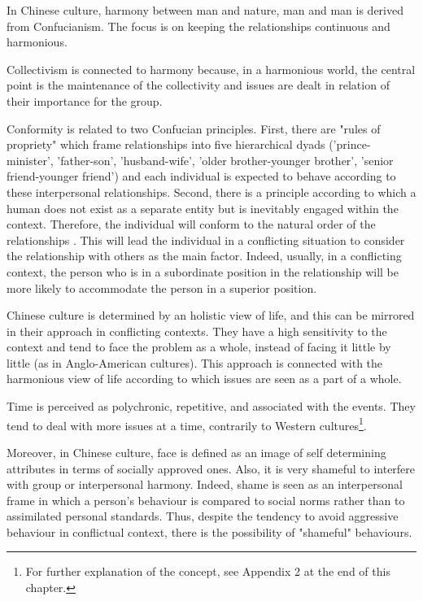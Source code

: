 \documentclass[../main.tex]{subfiles}
\begin{document}
In Chinese culture, harmony between man and nature, man and man is derived from Confucianism. The focus is on keeping the relationships continuous and harmonious. 

Collectivism is connected to harmony because, in a harmonious world, the central point is the maintenance of the collectivity and issues are dealt in relation of their importance for the group.

Conformity is related to two Confucian principles. First, there are "rules of propriety" which frame relationships into five hierarchical dyads ('prince-minister', 'father-son', 'husband-wife', 'older brother-younger brother', 'senior friend-younger friend') and each individual is expected to behave according to these interpersonal relationships. Second, there is a principle according to which a human does not exist as a separate entity but is inevitably engaged within the context. Therefore, the individual will conform to the natural order of the relationships \autocite[367-368]{tang}. This will lead the individual in a conflicting situation to consider the relationship with others as the main factor. Indeed, usually, in a conflicting context, the person who is in a subordinate position in the relationship will be more likely to accommodate the person in a superior position.

Chinese culture is determined by an holistic view of life, and this can be mirrored in their approach in conflicting contexts. They have a high sensitivity to the context and tend to face the problem as a whole, instead of facing it little by little (as in Anglo-American cultures). This approach is connected with the harmonious view of life according to which issues are seen as a part of a whole.

Time is perceived as polychronic, repetitive, and associated with the events. They tend to deal with more issues at a time, contrarily to Western cultures\footnote{For further explanation of the concept, see Appendix 2 at the end of this chapter.}. 

Moreover, in Chinese culture, face is defined as an image of self determining attributes in terms of socially approved ones. Also, it is very shameful to interfere with group or interpersonal harmony. Indeed, shame is seen as an interpersonal frame in which a person's behaviour is compared to social norms rather than to assimilated personal standards. Thus, despite the tendency to avoid aggressive behaviour in conflictual context, there is the possibility of "shameful" behaviours.
\end{document}

